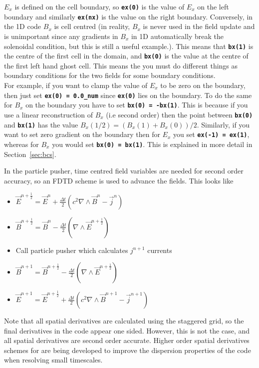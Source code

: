 \documentclass[12pt,a4paper]{article}
\newcommand{\inlinecode}[1]{{\color{warwickred} \bf\texttt{#1}}}
\newcommand{\sect}[1]{Section~\ref{sec:#1}}
\newcommand{\EPOCH}{{\color{warwickdark}\fontfamily{phv}\selectfont{EPOCH}}}
\begin{document}
$E_x$ is defined on the cell boundary, so \inlinecode{ex(0)} is the value of
$E_x$ on the left boundary and similarly \inlinecode{ex(nx)} is the
value on the right boundary. Conversely, in the 1D code $B_x$ is cell centred
(in reality, $B_x$ is never used in the field update and is unimportant since
any gradients in $B_x$ in 1D automatically break the solenoidal condition, but
this is still a useful example.). This means that \inlinecode{bx(1)} is the
centre of the first cell in the domain, and \inlinecode{bx(0)} is the value at
the centre of the first left hand ghost cell. This means the you must do
different things as boundary conditions for the two fields for some boundary
conditions.\\

For example, if you want to clamp the value of $E_x$ to be zero on the
boundary, then just set \inlinecode{ex(0) = 0.0\_num} since \inlinecode{ex(0)}
lies on the boundary. To do the same for $B_x$ on the boundary you have to
set \inlinecode{bx(0) = -bx(1)}. This is because if you use a linear
reconstruction of $B_x$ (i.e second order) then the point between
\inlinecode{bx(0)} and \inlinecode{bx(1)} has the value
$B_x(1/2) = \left(B_x(1)+B_x(0)\right)/2$. Similarly, if you want to set zero
gradient on the boundary then for $E_x$ you set \inlinecode{ex(-1) = ex(1)},
whereas for $B_x$ you would set \inlinecode{bx(0) = bx(1)}. This is explained
in more detail in \sect{bcs}.

In the particle pusher, time centred field variables are needed for second
order accuracy, so an FDTD scheme is used to advance the fields. This looks
like

\begin{itemize}
\item $\vec{E}^{n+\frac{1}{2}} = \vec{E}^n + \frac{\Delta t}{2} \left( c^2
  \nabla \wedge \vec{B}^{n} -\vec{j}^{n} \right)$
\item $\vec{B}^{n+\frac{1}{2}} = \vec{B}^n - \frac{\Delta t}{2} \left( \nabla
  \wedge \vec{E}^{n+\frac{1}{2}} \right)$
\item Call particle pusher which calculates $j^{n+1}$ currents
\item $\vec{B}^{n+1} = \vec{B}^{n+\frac{1}{2}} - \frac{\Delta t}{2} \left(
  \nabla \wedge \vec{E}^{n+\frac{1}{2}} \right)$
\item $\vec{E}^{n+1} = \vec{E}^{n+\frac{1}{2}} + \frac{\Delta t}{2} \left( c^2
  \nabla \wedge \vec{B} ^{n+1} - \vec{j}^{n+1} \right)$
\end{itemize}
Note that all spatial derivatives are calculated using the staggered grid, so
the final derivatives in the code appear one sided. However, this is not the
case, and all spatial derivatives are second order accurate. Higher order
spatial derivatives schemes for {\EPOCH} are being developed to improve the
dispersion properties of the code when resolving small timescales.
\end{document}
